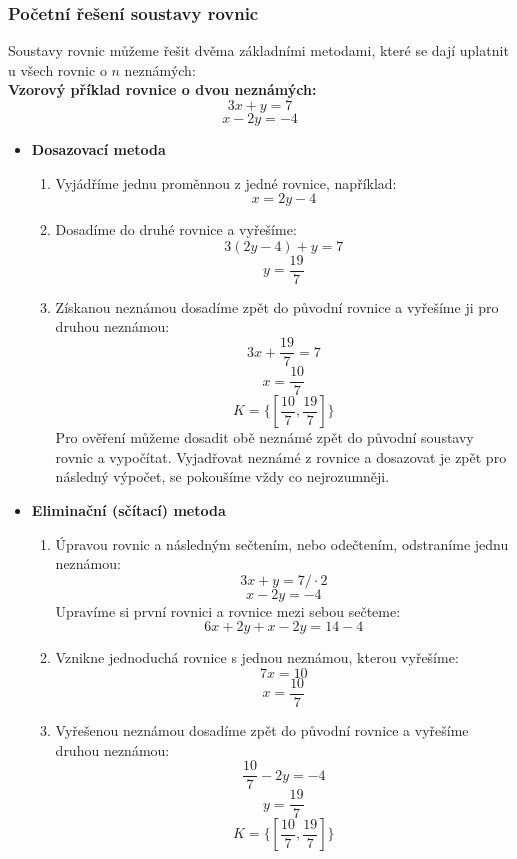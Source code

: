         \subsubsection{Početní řešení soustavy rovnic}
Soustavy rovnic můžeme řešit dvěma základními metodami, které se dají uplatnit u všech rovnic o $n$ neznámých:\\
\textbf{Vzorový příklad rovnice o dvou neznámých:}
$$
3x+y=7
$$
$$
x-2y=-4
$$
\begin{itemize}
    \item \textbf{Dosazovací metoda}
        \begin{enumerate}
            \item Vyjádříme jednu proměnnou z jedné rovnice, například: 
                $$
                x=2y-4
                $$
            \item Dosadíme do druhé rovnice a vyřešíme:
                $$
                3(2y-4)+y=7
                $$
                $$
                y=\frac{19}{7}
                $$
            \item Získanou neznámou dosadíme zpět do původní rovnice a vyřešíme ji pro druhou neznámou:
                $$
                3x+\frac{19}{7}=7
                $$
                $$
                x=\frac{10}{7}
                $$
                $$
                K=\{[\frac{10}{7}, \frac{19}{7}]\}
                $$
        Pro ověření můžeme dosadit obě neznámé zpět do původní soustavy rovnic a vypočítat. Vyjadřovat neznámé z rovnice a dosazovat je zpět pro následný výpočet, se pokoušíme vždy co nejrozumněji. 
        \end{enumerate}

    \item \textbf{Eliminační (sčítací) metoda}
        \begin{enumerate}
            \item Úpravou rovnic a následným sečtením, nebo odečtením, odstraníme jednu neznámou:
                $$
                3x+y=7 /\cdot2
                $$
                $$
                x-2y=-4
                $$
                Upravíme si první rovnici a rovnice mezi sebou sečteme:
                $$
                6x+2y+x-2y=14-4
                $$
            \item Vznikne jednoduchá rovnice s jednou neznámou, kterou vyřešíme:
                $$
                7x=10
                $$
                $$
                x=\frac{10}{7}
                $$
            \item Vyřešenou neznámou dosadíme zpět do původní rovnice a vyřešíme druhou neznámou:
                $$
                \frac{10}{7}-2y=-4
                $$
                $$
                y=\frac{19}{7}
                $$
                $$
                K=\{[\frac{10}{7}, \frac{19}{7}]\}
                $$
        \end{enumerate} 
        

\end{itemize}
